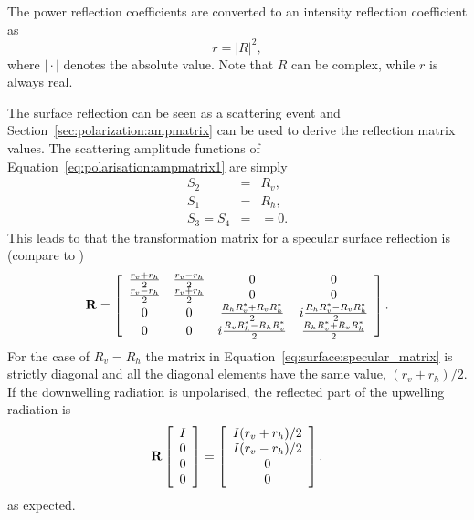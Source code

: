 The power reflection coefficients are converted to an intensity
 reflection coefficient as
 \begin{equation}
   \label{eq:surface:R2r}
   r = |R|^2,
 \end{equation}
 where $|\!\cdot\!|$ denotes the absolute value. Note that $R$ can be
 complex, while $r$ is always real.

The surface reflection can be seen as a scattering event and
Section~\ref{sec:polarization:ampmatrix} can be used to derive the
reflection matrix values. The scattering amplitude functions of
Equation~\ref{eq:polarisation:ampmatrix1} are simply
\begin{eqnarray}
  S_2 &=& R_v, \\
  S_1 &=& R_h, \\
  S_3 = S_4 &=& =0.
\end{eqnarray}
This leads to that the transformation matrix for a specular surface
reflection is (compare to \citet[Sec.\ 5.4.3]{liou:02})
\begin{equation}
  \label{eq:surface:specular_matrix}
  \mathbf{R} =
     \left[\begin{array}{cccc}
       \frac{r_v+r_h}{2}&\frac{r_v-r_h}{2}&0&0\\
       \frac{r_v-r_h}{2}&\frac{r_v+r_h}{2}&0&0\\
    0&0&\frac{R_hR_v^\ast+R_vR_h^\ast}{2}&i\frac{R_hR_v^\ast-R_vR_h^\ast}{2}\\
    0&0&i\frac{R_vR_h^\ast-R_hR_v^\ast}{2}&\frac{R_hR_v^\ast+R_vR_h^\ast}{2}\\
     \end{array}
     \right].
\end{equation}
For the case of $R_v=R_h$ the matrix in
Equation~\ref{eq:surface:specular_matrix} is strictly diagonal and all the
diagonal elements have the same value, $(r_v+r_h)/2$.
If the downwelling radiation is unpolarised, the reflected part of the
upwelling radiation is
\begin{equation}
  \mathbf{R}
  \left[ \begin{array}{c} I\\0\\0\\0 \end{array} \right] =
  \left[ \begin{array}{c} I(r_v+r_h)/2\\I(r_v-r_h)/2\\0\\0 
  \end{array} \right].
\end{equation}
as expected.


